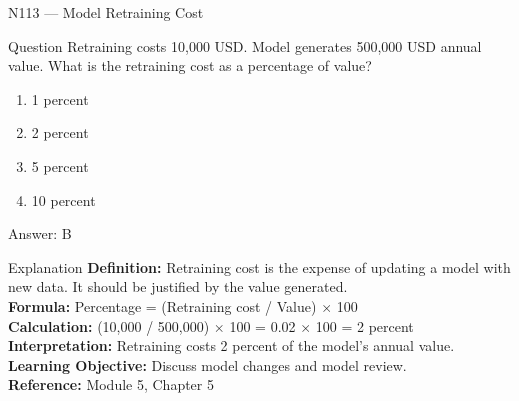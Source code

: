 \documentclass[aspectratio=169,8pt]{beamer}
\begin{document}
	\begin{frame}{N113 --- Model Retraining Cost}
		\begin{block}{Question}
			Retraining costs 10,000 USD. Model generates 500,000 USD annual value. What is the retraining cost as a percentage of value?
			\begin{enumerate}
				\item 1 percent
				\item 2 percent
				\item 5 percent
				\item 10 percent
			\end{enumerate}
		\end{block}
		\begin{exampleblock}{Answer: B}\end{exampleblock}
		\begin{block}{Explanation}
			\textbf{Definition:} Retraining cost is the expense of updating a model with new data. It should be justified by the value generated.\\
			\textbf{Formula:} Percentage = (Retraining cost / Value) $\times$ 100\\
			\textbf{Calculation:} (10,000 / 500,000) $\times$ 100 = 0.02 $\times$ 100 = 2 percent\\
			\textbf{Interpretation:} Retraining costs 2 percent of the model's annual value.\\
			\textbf{Learning Objective:} Discuss model changes and model review.\\
			\textbf{Reference:} Module 5, Chapter 5
		\end{block}
	\end{frame}
	
\end{document}
